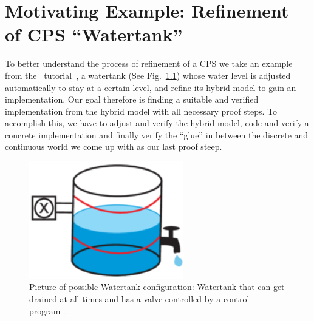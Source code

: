 



\chapter{Motivating Example: Refinement of CPS ``Watertank''}
\label{ch:Watertank}

To better understand the process of refinement of a CPS we take an example from the \keym~tutorial~\cite{keYmaera}, a watertank (See Fig.~\ref{fig:watertank}) whose water level is adjusted automatically to stay at a certain level, and refine its hybrid model to gain an implementation. Our goal therefore is finding a suitable and verified implementation from the hybrid model with all necessary proof steps. To accomplish this, we have to adjust and verify the hybrid model, code and verify a concrete implementation and finally verify the ``glue'' in between the discrete and continuous world we come up with as our last proof steep. 

\begin{figure}[h!]
	\setcounter{figure}{0}
	\centering
	\includegraphics[width=0.6\textwidth]{images/watertank}
	\caption{Picture of possible Watertank configuration: Watertank that can get drained at all times and has a valve controlled by a control program~\cite{keymaeraGuide}.}
	\label{fig:watertank}
\end{figure}

